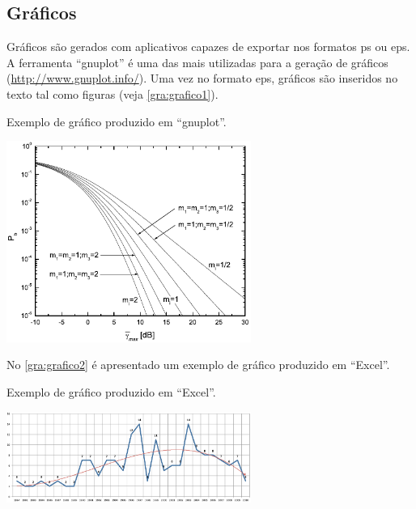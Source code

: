 \subsection{Gráficos}\label{sec:graficos}

Gráficos são gerados com aplicativos capazes de exportar nos formatos \gls{ps} ou \gls{eps}. A ferramenta ``gnuplot'' é uma das mais utilizadas para a geração de gráficos (\url{http://www.gnuplot.info/}). Uma vez no formato \gls{eps}, gráficos são inseridos no texto tal como figuras (veja \autoref{gra:grafico1}).

\begin{graph}[htb]%
\captionsetup{width=0.6\textwidth}%
\caption{Exemplo de gráfico produzido em ``gnuplot''.}%
\label{gra:grafico1}%
\includegraphics[width=0.6\textwidth]{./CapituloExemplo/grafico1}%
\end{graph}

No \autoref{gra:grafico2} é apresentado um exemplo de gráfico produzido em ``Excel''.

\begin{graph}[htb]%
\captionsetup{width=0.6\textwidth}%
\caption{Exemplo de gráfico produzido em ``Excel''.}%
\label{gra:grafico2}%
\includegraphics[width=0.6\textwidth]{./CapituloExemplo/grafico2}%
\end{graph}

